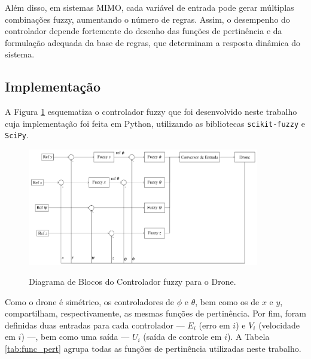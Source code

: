 Além disso, em sistemas MIMO, cada variável de entrada pode gerar 
múltiplas combinações fuzzy, aumentando o número de regras. Assim, o desempenho do controlador 
depende fortemente do desenho das funções de pertinência e da formulação adequada da base de 
regras, que determinam a resposta dinâmica do sistema.

\subsection{Implementação}
A Figura \ref{fig:pid_diagram} esquematiza o controlador fuzzy que foi desenvolvido neste trabalho cuja 
implementação foi feita em Python, utilizando as bibliotecas \texttt{scikit-fuzzy} e \texttt{SciPy}. 
\begin{figure}[h!]
    \centering
    \caption{Diagrama de Blocos do Controlador fuzzy para o Drone.}
    \includegraphics[width=0.9\textwidth]{figs/fuzzy_drone.png}
    \label{fig:pid_diagram}
\end{figure}

\pagebreak

Como o drone é simétrico, os controladores de $\phi$ e $\theta$, bem como os de $x$ e $y$, 
compartilham, respectivamente, as mesmas funções de pertinência. Por fim, foram definidas duas 
entradas para cada controlador — $E_i$ (erro em $i$) e $V_i$ (velocidade em $i$) —, bem como uma 
saída — $U_i$ (saída de controle em $i$). A Tabela \ref{tab:func_pert} agrupa todas as funções de pertinência 
utilizadas neste trabalho.



